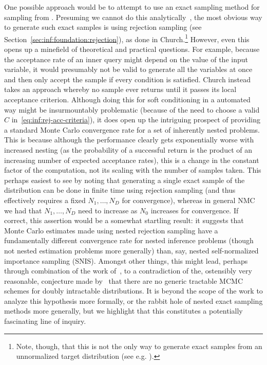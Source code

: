 One possible approach would be to attempt to
use an exact sampling method for sampling from \conditional. Presuming we cannot
do this analytically~\citep{cornish2017efficient}, the most obvious way to generate such exact
samples is using rejection sampling (see Section~\ref{sec:inf:foundation:rejection}), as done in
Church.\footnote{Note, though, that this
is not the only way to generate exact samples from an unnormalized target distribution (see e.g. \citep{craiu2011perfection}).}
However, even this opens up a minefield of theoretical
and practical questions.  For example, because the acceptance rate of an inner query might depend on the
value of the input variable, it would presumably not be valid to generate all the variables at once
and then only accept the sample if every condition is satisfied.
Church instead takes an approach whereby no sample ever returns until it passes its local acceptance criterion.
Although doing this for soft conditioning in a automated way might be insurmountably problematic (because of the
need to choose a valid $C$ in~\eqref{eq:inf:rej-acc-criteria}), it does open up the intriguing prospect
of providing a standard Monte Carlo convergence rate for a set of inherently nested problems.  This is because although the performance clearly
gets exponentially worse with increased nesting (as the probability of a successful return is the
product of an increasing number of expected acceptance rates), this is a change in the constant factor of the
computation, not its scaling with the number of samples taken.  This perhaps easiest to see by noting that 
generating a single exact sample of the distribution
can be done in finite time using rejection sampling (and thus effectively requires a fixed $N_1,\dots,N_D$ for
convergence), whereas in general NMC we had that $N_1,\dots,N_D$ need to increase as $N_0$ increases for convergence.
If correct, this assertion would be a somewhat startling result: it suggests that Monte Carlo 
estimates made using nested rejection sampling have a fundamentally different
convergence rate for nested inference problems (though not nested estimation problems more generally) than, say,
nested self-normalized importance sampling (SNIS).  Amongst other things, this might lead, 
perhaps through combination of 
the work of~\cite{moller2006efficient}, to a contradiction of the, ostensibly very reasonable, conjecture
made by~\cite{murray2004bayesian} that there are no generic tractable MCMC schemes for doubly intractable distributions.
It is beyond the scope of the work to analyze this hypothesis more formally, or the rabbit hole of
nested exact sampling methods more generally, but we highlight that this constitutes a potentially fascinating line of inquiry.

